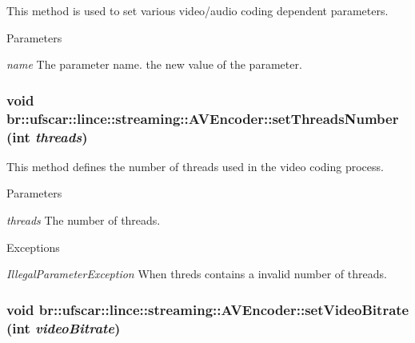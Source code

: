 This method is used to set various video/audio coding dependent parameters. 


\begin{DoxyParams}{Parameters}
\item[{\em name}]The parameter name.  the new value of the parameter. \end{DoxyParams}
\hypertarget{classbr_1_1ufscar_1_1lince_1_1streaming_1_1AVEncoder_ab1aeb8d77d5bd17ba0581807dab36b57}{
\subsubsection[{setThreadsNumber}]{\setlength{\rightskip}{0pt plus 5cm}void br::ufscar::lince::streaming::AVEncoder::setThreadsNumber (int {\em threads})}}
\label{classbr_1_1ufscar_1_1lince_1_1streaming_1_1AVEncoder_ab1aeb8d77d5bd17ba0581807dab36b57}


This method defines the number of threads used in the video coding process. 


\begin{DoxyParams}{Parameters}
\item[{\em threads}]The number of threads. \end{DoxyParams}

\begin{DoxyExceptions}{Exceptions}
\item[{\em IllegalParameterException}]When threds contains a invalid number of threads. \end{DoxyExceptions}
\hypertarget{classbr_1_1ufscar_1_1lince_1_1streaming_1_1AVEncoder_aa2d859ee4c5389f7d2b887722731b143}{
\subsubsection[{setVideoBitrate}]{\setlength{\rightskip}{0pt plus 5cm}void br::ufscar::lince::streaming::AVEncoder::setVideoBitrate (int {\em videoBitrate})}}
\label{classbr_1_1ufscar_1_1lince_1_1streaming_1_1AVEncoder_aa2d859ee4c5389f7d2b887722731b143}


